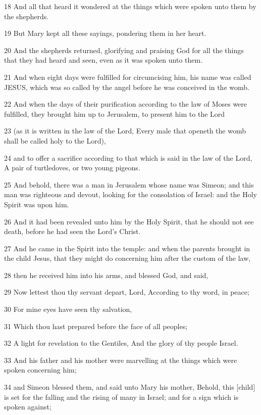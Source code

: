 \par 18 And all that heard it wondered at the things which were spoken unto them by the shepherds.
\par 19 But Mary kept all these sayings, pondering them in her heart.
\par 20 And the shepherds returned, glorifying and praising God for all the things that they had heard and seen, even as it was spoken unto them.
\par 21 And when eight days were fulfilled for circumcising him, his name was called JESUS, which was so called by the angel before he was conceived in the womb.
\par 22 And when the days of their purification according to the law of Moses were fulfilled, they brought him up to Jerusalem, to present him to the Lord
\par 23 (as it is written in the law of the Lord, Every male that openeth the womb shall be called holy to the Lord),
\par 24 and to offer a sacrifice according to that which is said in the law of the Lord, A pair of turtledoves, or two young pigeons.
\par 25 And behold, there was a man in Jerusalem whose name was Simeon; and this man was righteous and devout, looking for the consolation of Israel: and the Holy Spirit was upon him.
\par 26 And it had been revealed unto him by the Holy Spirit, that he should not see death, before he had seen the Lord's Christ.
\par 27 And he came in the Spirit into the temple: and when the parents brought in the child Jesus, that they might do concerning him after the custom of the law,
\par 28 then he received him into his arms, and blessed God, and said,
\par 29 Now lettest thou thy servant depart, Lord, According to thy word, in peace;
\par 30 For mine eyes have seen thy salvation,
\par 31 Which thou hast prepared before the face of all peoples;
\par 32 A light for revelation to the Gentiles, And the glory of thy people Israel.
\par 33 And his father and his mother were marvelling at the things which were spoken concerning him;
\par 34 and Simeon blessed them, and said unto Mary his mother, Behold, this [child] is set for the falling and the rising of many in Israel; and for a sign which is spoken against;

